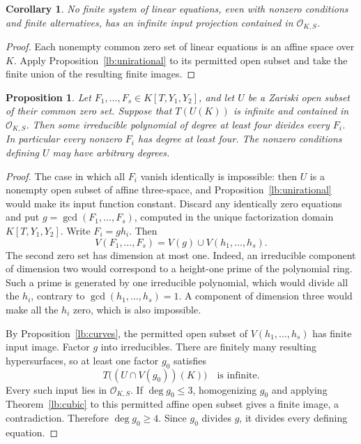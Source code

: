 \documentclass[11pt,a4paper]{article}
\newtheorem{proposition}[theorem]{Proposition}
\newtheorem{corollary}[theorem]{Corollary}
\theoremstyle{definition}
\newcommand{\OKS}{\mathcal O_{K,S}}
\begin{document}
\begin{corollary}\label{lb:linear-systems}
No finite system of linear equations, even with nonzero conditions
and finite alternatives, has an infinite input projection contained
in $\OKS$.
\end{corollary}
\begin{proof}
Each nonempty common zero set of linear equations is an affine
space over $K$. Apply Proposition~\ref{lb:unirational} to its
permitted open subset and take the finite union of the resulting
finite images.
\end{proof}

\begin{proposition}\label{lb:three-coordinate-systems}
Let $F_1,\ldots,F_s\in K[T,Y_1,Y_2]$, and let $U$ be a
Zariski open subset of their common zero set. Suppose that
$T(U(K))$ is infinite and contained in $\OKS$. Then some
irreducible polynomial of degree at least four divides every
$F_i$. In particular every nonzero $F_i$ has degree at least four.
The nonzero conditions defining $U$ may have arbitrary degrees.
\end{proposition}
\begin{proof}
The case in which all $F_i$ vanish identically is impossible:
then $U$ is a nonempty open subset of affine three-space, and
Proposition~\ref{lb:unirational} would make its input function
constant. Discard any identically zero equations and put
$g=\gcd(F_1,\ldots,F_s)$, computed in the unique factorization
domain $K[T,Y_1,Y_2]$. Write $F_i=gh_i$. Then
\[
 V(F_1,\ldots,F_s)=V(g)\cup V(h_1,\ldots,h_s).
\]
The second zero set has dimension at most one. Indeed, an
irreducible component of dimension two would correspond to a
height-one prime of the polynomial ring. Such a prime is
generated by one irreducible polynomial, which would divide
all the $h_i$, contrary to $\gcd(h_1,\ldots,h_s)=1$.
A component of dimension three would make all the $h_i$ zero,
which is also impossible.

By Proposition~\ref{lb:curves}, the permitted open subset of
$V(h_1,\ldots,h_s)$ has finite input image. Factor $g$ into
irreducibles. There are finitely many resulting hypersurfaces,
so at least one factor $g_0$ satisfies
\[
                   T\bigl((U\cap V(g_0))(K)\bigr)
                       \quad\text{is infinite}.
\]
Every such input lies in $\OKS$. If $\deg g_0\le3$,
homogenizing $g_0$ and applying Theorem~\ref{lb:cubic} to
this permitted affine open subset gives a finite image,
a contradiction. Therefore $\deg g_0\ge4$. Since $g_0$
divides $g$, it divides every defining equation.
\end{proof}
\end{document}
